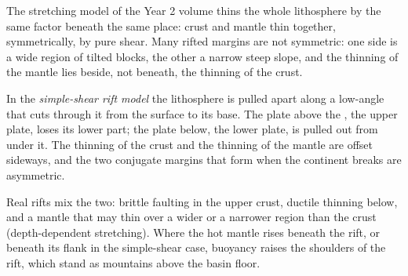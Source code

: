 The stretching model of the Year 2 volume thins the whole lithosphere by the
same factor beneath the same place: crust and mantle thin together,
symmetrically, by pure shear. Many rifted margins are not symmetric: one side
is a wide region of tilted blocks, the other a narrow steep slope, and the
thinning of the mantle lies beside, not beneath, the thinning of the crust.

\begin{definition}\label{def:b3:extension-strike-slip:rift-models}
In the \emph{simple-shear rift model} the
lithosphere is pulled apart along a low-angle  that cuts through it
from the surface to its base. The plate above the , the upper
plate, loses its lower part; the plate below, the lower plate, is pulled out
from under it. The thinning of the crust and the thinning of the mantle are
offset sideways, and the two conjugate margins that form when the continent
breaks are asymmetric.
\end{definition}

Real rifts mix the two: brittle faulting in the upper crust, ductile thinning
below, and a mantle that may thin over a wider or a narrower region than the
crust (depth-dependent stretching). Where the hot mantle rises beneath the
rift, or beneath its flank in the simple-shear case, buoyancy raises the
shoulders of the rift, which stand as mountains above the basin floor.

